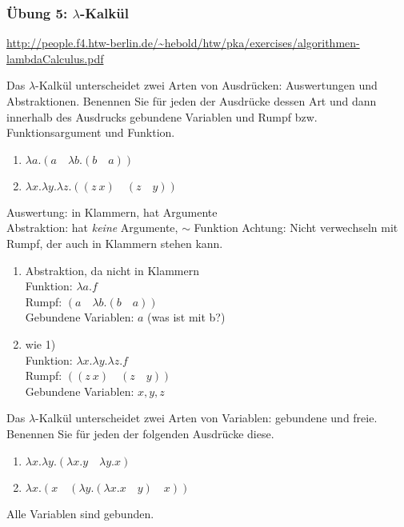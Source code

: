 \begin{card}
	\frametitle{Übung 5: $\lambda$-Kalkül}
	\url{http://people.f4.htw-berlin.de/~hebold/htw/pka/exercises/algorithmen-lambdaCalculus.pdf}
\end{card}

\begin{card}
	Das $\lambda$-Kalkül unterscheidet zwei Arten von Ausdrücken: Auswertungen und Abstraktionen. Benennen Sie für jeden der Ausdrücke dessen Art und dann innerhalb des Ausdrucks gebundene Variablen und Rumpf bzw. Funktionsargument und Funktion. 
	\begin{enumerate}
	\item $\lambda a.(a \quad \lambda b.(b \quad a))$
	\item $\lambda x.\lambda y.\lambda z.((z \ x) \quad (z \quad y))$
	\end{enumerate}
	\hr
	Auswertung: in Klammern, hat Argumente\\
	Abstraktion: hat \textit{keine} Argumente, $\sim$ Funktion
	Achtung: Nicht verwechseln mit Rumpf, der auch in Klammern stehen kann.
	\begin{enumerate}
	\item Abstraktion, da nicht in Klammern\\
	Funktion: $\lambda a.f$\\
	Rumpf: $(a \quad \lambda b.(b \quad a))$\\
	Gebundene Variablen: $a$ (was ist mit b?)
	\item wie 1)\\
	Funktion: $\lambda x.\lambda y.\lambda z.f$ \\
	Rumpf: $((z \ x) \quad (z \quad y))$\\
	Gebundene Variablen: $x,y,z$
	\end{enumerate}
\end{card}


\begin{card}
	Das $\lambda$-Kalkül unterscheidet zwei Arten von Variablen: gebundene und freie. Benennen Sie für jeden der folgenden Ausdrücke diese.
	\begin{enumerate}
	\item $\lambda x.\lambda y.(\lambda x.y \quad \lambda y.x)$
	\item $\lambda x.(x \quad (\lambda y.(\lambda x.x \quad y) \quad x))$
	\end{enumerate}
	\hr
	Alle Variablen sind gebunden.
\end{card}


